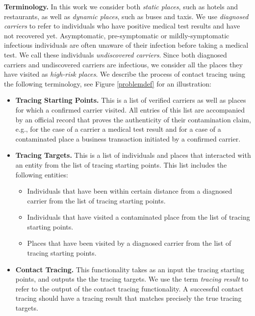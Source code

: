 \documentclass[11pt,dvipdfmx]{article}  %
\begin{document}
\textbf{Terminology.} In this work we consider both \emph{static places}, such as hotels and restaurants, as well as \emph{dynamic places}, such as buses and taxis. 
We use \emph{diagnosed carriers} to refer to individuals who have positive medical test results and have not recovered yet. 
Asymptomatic, pre-symptomatic or mildly-symptomatic infectious individuals are often unaware of their infection before taking a medical test. We call these individuals \emph{undiscovered carriers}. Since both diagnosed carriers and undiscovered carriers are infectious, we consider all the places they have visited as \emph{high-risk places}. %
We describe the process of contact tracing  using the following terminology, see
Figure \ref{problemdef} for an illustration:

\begin{itemize}
    \item \textbf{Tracing Starting Points.} This is a list of verified carriers as well as places for which a confirmed carrier visited. All entries of this list are accompanied by an official record that proves the authenticity of their contamination claim, e.g., for the case of a carrier a medical test result and for a case of a contaminated place a business transaction initiated by a confirmed carrier. 
    \item \textbf{Tracing Targets.} This is a list of individuals and places that interacted with an entity from the list of tracing starting points. This list includes the following entities:
    \begin{itemize}
        \item Individuals that have been within certain distance from a diagnosed carrier from the list of tracing starting points.
        \item Individuals that have visited a contaminated place from the list of tracing starting points.
        \item Places that have been visited by a diagnosed carrier from the list of tracing starting points.
    \end{itemize}
    \item \textbf{Contact Tracing.} This functionality takes as an input the tracing starting points, and outputs the the tracing targets. We use the term \emph{tracing result} to refer to the output of the contact tracing functionality. A successful contact tracing should have a tracing result that matches precisely the true tracing targets.
\end{itemize}
\end{document}
